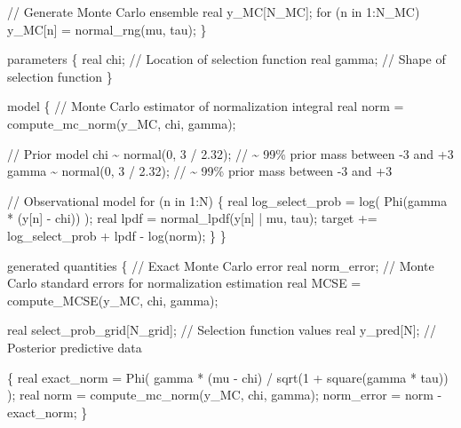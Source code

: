 \documentclass[
  letterpaper,
  DIV=11,
  numbers=noendperiod]{scrartcl}
\newenvironment{Shaded}{\begin{snugshade}}{\end{snugshade}}
\newcommand{\CommentTok}[1]{\textcolor[rgb]{0.37,0.37,0.37}{#1}}
\newcommand{\ControlFlowTok}[1]{\textcolor[rgb]{0.00,0.23,0.31}{#1}}
\newcommand{\DataTypeTok}[1]{\textcolor[rgb]{0.68,0.00,0.00}{#1}}
\newcommand{\DecValTok}[1]{\textcolor[rgb]{0.68,0.00,0.00}{#1}}
\newcommand{\FloatTok}[1]{\textcolor[rgb]{0.68,0.00,0.00}{#1}}
\newcommand{\KeywordTok}[1]{\textcolor[rgb]{0.00,0.23,0.31}{#1}}
\newcommand{\NormalTok}[1]{\textcolor[rgb]{0.00,0.23,0.31}{#1}}
\begin{document}
\begin{codelisting}
\begin{Shaded}
\begin{Highlighting}[]
  \CommentTok{// Generate Monte Carlo ensemble}
  \DataTypeTok{real}\NormalTok{ y\_MC[N\_MC];}
  \ControlFlowTok{for}\NormalTok{ (n }\ControlFlowTok{in} \DecValTok{1}\NormalTok{:N\_MC) }
\NormalTok{    y\_MC[n] = normal\_rng(mu, tau);}
\NormalTok{\}}

\KeywordTok{parameters}\NormalTok{ \{}
  \DataTypeTok{real}\NormalTok{ chi;   }\CommentTok{// Location of selection function}
  \DataTypeTok{real}\NormalTok{ gamma; }\CommentTok{// Shape of selection function}
\NormalTok{\}}

\KeywordTok{model}\NormalTok{ \{}
  \CommentTok{// Monte Carlo estimator of normalization integral}
  \DataTypeTok{real}\NormalTok{ norm = compute\_mc\_norm(y\_MC, chi, gamma);}
  
  \CommentTok{// Prior model}
\NormalTok{  chi \textasciitilde{} normal(}\DecValTok{0}\NormalTok{, }\DecValTok{3}\NormalTok{ / }\FloatTok{2.32}\NormalTok{);   }\CommentTok{// \textasciitilde{} 99\% prior mass between {-}3 and +3}
\NormalTok{  gamma \textasciitilde{} normal(}\DecValTok{0}\NormalTok{, }\DecValTok{3}\NormalTok{ / }\FloatTok{2.32}\NormalTok{); }\CommentTok{// \textasciitilde{} 99\% prior mass between {-}3 and +3}
  
  \CommentTok{// Observational model}
  \ControlFlowTok{for}\NormalTok{ (n }\ControlFlowTok{in} \DecValTok{1}\NormalTok{:N) \{}
    \DataTypeTok{real}\NormalTok{ log\_select\_prob = log( Phi(gamma * (y[n] {-} chi)) );}
    \DataTypeTok{real}\NormalTok{ lpdf = normal\_lpdf(y[n] | mu, tau);}
    \KeywordTok{target +=}\NormalTok{ log\_select\_prob + lpdf {-} log(norm);}
\NormalTok{  \}}
\NormalTok{\}}

\KeywordTok{generated quantities}\NormalTok{ \{}
  \CommentTok{// Exact Monte Carlo error}
  \DataTypeTok{real}\NormalTok{ norm\_error;}
  \CommentTok{// Monte Carlo standard errors for normalization estimation}
  \DataTypeTok{real}\NormalTok{ MCSE = compute\_MCSE(y\_MC, chi, gamma);}
  
  \DataTypeTok{real}\NormalTok{ select\_prob\_grid[N\_grid]; }\CommentTok{// Selection function values}
  \DataTypeTok{real}\NormalTok{ y\_pred[N];                }\CommentTok{// Posterior predictive data}
  
\NormalTok{  \{}
    \DataTypeTok{real}\NormalTok{ exact\_norm = Phi(  gamma * (mu {-} chi) }
\NormalTok{                          / sqrt(}\DecValTok{1}\NormalTok{ + square(gamma * tau)) );}
    \DataTypeTok{real}\NormalTok{ norm = compute\_mc\_norm(y\_MC, chi, gamma);}
\NormalTok{    norm\_error = norm {-} exact\_norm;}
\NormalTok{  \}}
  

\end{Highlighting}
\end{Shaded}
\end{codelisting}
\end{document}
